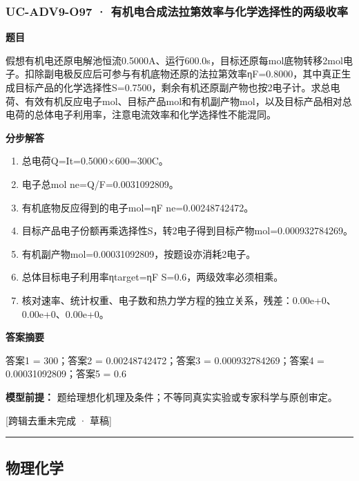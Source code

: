 \documentclass[UTF8,11pt,a4paper]{ctexart}
\begin{document}
\subsubsection*{UC-ADV9-O97 · 有机电合成法拉第效率与化学选择性的两级收率}
\noindent\textbf{题目}\par
假想有机电还原电解池恒流0.5000A、运行600.0s，目标还原每mol底物转移2mol电子。扣除副电极反应后可参与有机底物还原的法拉第效率ηF=0.8000，其中真正生成目标产品的化学选择性S=0.7500，剩余有机还原副产物也按2电子计。求总电荷、有效有机反应电子mol、目标产品mol和有机副产物mol，以及目标产品相对总电荷的总体电子利用率，注意电流效率和化学选择性不能混同。\par
\medskip\noindent\textbf{分步解答}
\begin{enumerate}
\item 总电荷Q=It=0.5000×600=300C。
\item 电子总mol ne=Q/F=0.0031092809。
\item 有机底物反应得到的电子mol=ηF ne=0.00248742472。
\item 目标产品电子份额再乘选择性S，转2电子得到目标产物mol=0.000932784269。
\item 有机副产物mol=0.00031092809，按题设亦消耗2电子。
\item 总体目标电子利用率ηtarget=ηF S=0.6，两级效率必须相乘。
\item 核对速率、统计权重、电子数和热力学方程的独立关系，残差：0.00e+0、0.00e+0、0.00e+0。
\end{enumerate}
\noindent\textbf{答案摘要}\par
答案1 = 300；答案2 = 0.00248742472；答案3 = 0.000932784269；答案4 = 0.00031092809；答案5 = 0.6\par
\noindent\textbf{模型前提：}
题给理想化机理及条件；不等同真实实验或专家科学与原创审定。\par
\noindent\textcolor{red!65!black}{[跨辑去重未完成 · 草稿]} \par
\medskip\hrule\medskip
\subsection*{物理化学}
\end{document}
